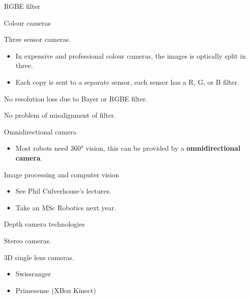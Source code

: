 \documentclass[compress]{beamer}
\providecommand{\tightlist}{%
  \setlength{\itemsep}{0pt}\setlength{\parskip}{0pt}}
\begin{document}
\begin{frame}{RGBE filter}

\end{frame}

\begin{frame}{Colour cameras}

Three sensor cameras.

\begin{itemize}
\tightlist
\item
  In expensive and professional colour cameras, the images is optically
  split in three.
\item
  Each copy is sent to a separate sensor, each sensor has a R, G, or B
  filter.
\end{itemize}

No resolution loss due to Bayer or RGBE filter.

No problem of misalignment of filter.

\end{frame}

\begin{frame}{Omnidirectional camera}

\begin{itemize}
\tightlist
\item
  Most robots need 360° vision, this can be provided by a
  \textbf{omnidirectional camera}.
\end{itemize}

\end{frame}

\begin{frame}{Image processing and computer vision}

\begin{itemize}
\tightlist
\item
  See Phil Culverhouse's lectures.
\item
  Take an MSc Robotics next year.
\end{itemize}

\end{frame}

\begin{frame}{Depth camera technologies}

Stereo cameras.

3D single lens cameras.

\begin{itemize}
\tightlist
\item
  Swissranger
\item
  Primesense (XBox Kinect)
\end{itemize}

\end{frame}
\end{document}
